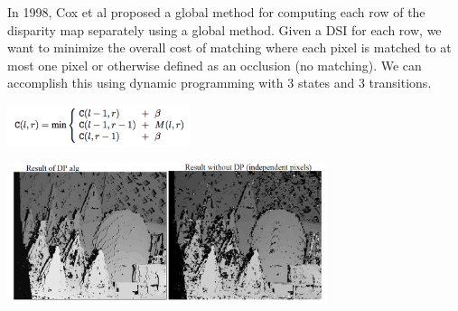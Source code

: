 \documentclass{article}
\begin{document}
\begin{figure}[!htbp]
 \centering
    \qquad
    \label{fig:example}%
\end{figure}

In 1998, Cox et al proposed a global method for computing each row of the disparity map separately using a global method. Given a DSI for each row, we want to minimize the overall cost of matching where each pixel is matched to at most one pixel or otherwise defined as an occlusion (no matching). We can accomplish this using dynamic programming with 3 states and 3 transitions. 

\begin{center}
    \includegraphics[width=0.4\textwidth]{DP3.png}
\end{center}

\begin{center}
    \includegraphics[width=0.7\textwidth]{DPdemo.png}
\end{center}
\end{document}
